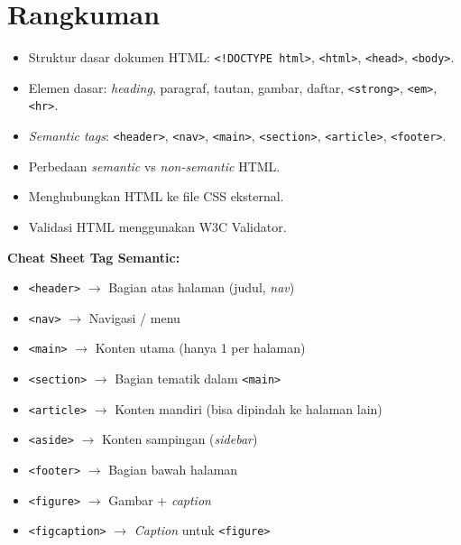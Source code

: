 \section{Rangkuman}
\label{sec:m03-rangkuman}

\begin{itemize}
  \item Struktur dasar dokumen HTML: \texttt{<!DOCTYPE html>}, \texttt{<html>}, \texttt{<head>}, \texttt{<body>}.
  \item Elemen dasar: \emph{heading}, paragraf, tautan, gambar, daftar, \texttt{<strong>}, \texttt{<em>}, \texttt{<hr>}.
  \item \emph{Semantic tags}: \texttt{<header>}, \texttt{<nav>}, \texttt{<main>}, \texttt{<section>}, \texttt{<article>}, \texttt{<footer>}.
  \item Perbedaan \emph{semantic} vs \emph{non-semantic} HTML.
  \item Menghubungkan HTML ke file CSS eksternal.
  \item Validasi HTML menggunakan W3C Validator.
\end{itemize}

\begin{tip}
\textbf{Cheat Sheet Tag Semantic:}
\begin{itemize}
  \item \texttt{<header>} $\rightarrow$ Bagian atas halaman (judul, \emph{nav})
  \item \texttt{<nav>} $\rightarrow$ Navigasi / menu
  \item \texttt{<main>} $\rightarrow$ Konten utama (hanya 1 per halaman)
  \item \texttt{<section>} $\rightarrow$ Bagian tematik dalam \texttt{<main>}
  \item \texttt{<article>} $\rightarrow$ Konten mandiri (bisa dipindah ke halaman lain)
  \item \texttt{<aside>} $\rightarrow$ Konten sampingan (\emph{sidebar})
  \item \texttt{<footer>} $\rightarrow$ Bagian bawah halaman
  \item \texttt{<figure>} $\rightarrow$ Gambar + \emph{caption}
  \item \texttt{<figcaption>} $\rightarrow$ \emph{Caption} untuk \texttt{<figure>}
\end{itemize}
\end{tip}
